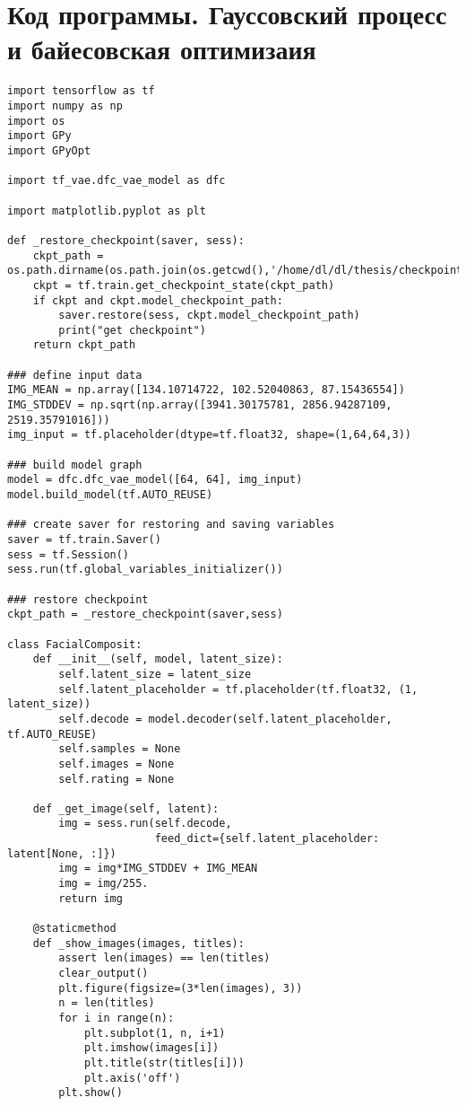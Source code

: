 \section*{\centering Код программы. Гауссовский процесс и байесовская оптимизаия}
\begin{footnotesize}
\begin{lstlisting}
import tensorflow as tf
import numpy as np
import os
import GPy
import GPyOpt

import tf_vae.dfc_vae_model as dfc

import matplotlib.pyplot as plt

def _restore_checkpoint(saver, sess):
    ckpt_path = os.path.dirname(os.path.join(os.getcwd(),'/home/dl/dl/thesis/checkpoint_8/'))
    ckpt = tf.train.get_checkpoint_state(ckpt_path)
    if ckpt and ckpt.model_checkpoint_path:
        saver.restore(sess, ckpt.model_checkpoint_path)
        print("get checkpoint")
    return ckpt_path

### define input data
IMG_MEAN = np.array([134.10714722, 102.52040863, 87.15436554])
IMG_STDDEV = np.sqrt(np.array([3941.30175781, 2856.94287109, 2519.35791016]))
img_input = tf.placeholder(dtype=tf.float32, shape=(1,64,64,3))

### build model graph
model = dfc.dfc_vae_model([64, 64], img_input)
model.build_model(tf.AUTO_REUSE)

### create saver for restoring and saving variables
saver = tf.train.Saver()
sess = tf.Session()
sess.run(tf.global_variables_initializer())

### restore checkpoint
ckpt_path = _restore_checkpoint(saver,sess)

class FacialComposit:
    def __init__(self, model, latent_size):
        self.latent_size = latent_size
        self.latent_placeholder = tf.placeholder(tf.float32, (1, latent_size))
        self.decode = model.decoder(self.latent_placeholder, tf.AUTO_REUSE)
        self.samples = None
        self.images = None
        self.rating = None

    def _get_image(self, latent):
        img = sess.run(self.decode, 
                       feed_dict={self.latent_placeholder: latent[None, :]})
        img = img*IMG_STDDEV + IMG_MEAN
        img = img/255.
        return img

    @staticmethod
    def _show_images(images, titles):
        assert len(images) == len(titles)
        clear_output()
        plt.figure(figsize=(3*len(images), 3))
        n = len(titles)
        for i in range(n):
            plt.subplot(1, n, i+1)
            plt.imshow(images[i])
            plt.title(str(titles[i]))
            plt.axis('off')
        plt.show()


\end{lstlisting}
\end{footnotesize}
